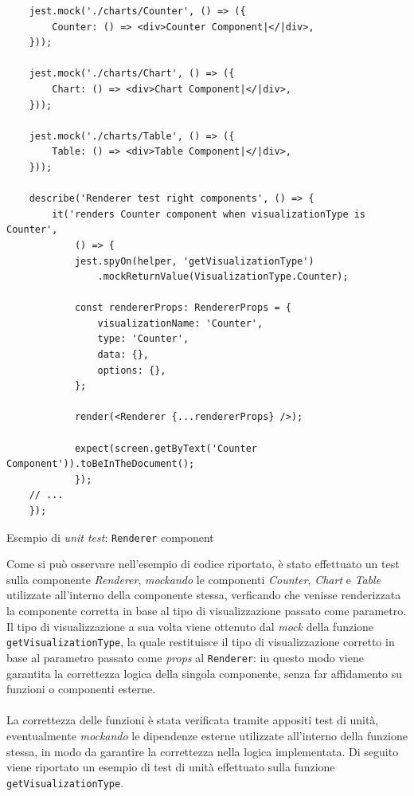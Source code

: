 \begin{listing}[H]
    \begin{verbatim}
    jest.mock('./charts/Counter', () => ({
        Counter: () => <div>Counter Component|</|div>,
    }));

    jest.mock('./charts/Chart', () => ({
        Chart: () => <div>Chart Component|</|div>,
    }));

    jest.mock('./charts/Table', () => ({
        Table: () => <div>Table Component|</|div>,
    }));

    describe('Renderer test right components', () => {
        it('renders Counter component when visualizationType is Counter', 
            () => {
            jest.spyOn(helper, 'getVisualizationType')
                .mockReturnValue(VisualizationType.Counter);

            const rendererProps: RendererProps = {
                visualizationName: 'Counter',
                type: 'Counter',
                data: {},
                options: {},
            };

            render(<Renderer {...rendererProps} />);

            expect(screen.getByText('Counter Component')).toBeInTheDocument();
            });
    // ...
    });
    \end{verbatim}
    \caption{Esempio di \textit{unit test}: \texttt{Renderer} component}
    \label{listing:test_Renderer}
\end{listing}

Come si può osservare nell'esempio di codice riportato, è stato effettuato un test sulla componente \textit{Renderer},
\textit{mockando} le componenti \textit{Counter}, \textit{Chart} e \textit{Table} utilizzate all'interno della componente stessa, verficando che venisse renderizzata
la componente corretta in base al tipo di visualizzazione passato come parametro. \newline
Il tipo di visualizzazione a sua volta viene ottenuto dal \textit{mock} della funzione \\
\texttt{getVisualizationType}, la quale restituisce il tipo di visualizzazione
corretto in base al parametro passato come \textit{props} al \texttt{Renderer}: in questo modo viene garantita la correttezza logica della singola componente, senza far affidamento
su funzioni o componenti esterne. \\ \\
La correttezza delle funzioni è stata verificata tramite appositi test di unità, eventualmente \textit{mockando} le dipendenze esterne utilizzate
all'interno della funzione stessa, in modo da garantire la correttezza nella logica implementata. \newline
Di seguito viene riportato un esempio di test di unità effettuato sulla funzione \\
\texttt{getVisualizationType}.

